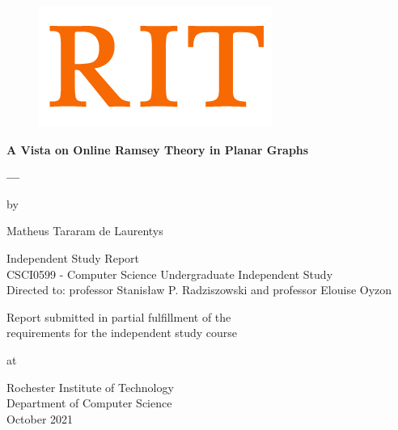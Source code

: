 \begin{titlepage}
\begin{figure}[H]
    \hspace*{-1.0cm}
    \vspace*{-0.5cm}
    \includegraphics[scale=1]{images/logo_rit.jpg}\\
\end{figure}

\begin{center}
    \vspace*{2cm}
    
    {\LARGE \textbf{A Vista on Online Ramsey Theory in Planar Graphs}}
    
    \vspace{0.5cm}
    \textbf{---}
    
	\vspace{1cm}
	 by
    \vspace{1cm}
    
   Matheus Tararam de Laurentys
\end{center}

\vspace{1cm}

\begin{center}   
	{\large Independent Study Report \\ 
		CSCI0599 - Computer Science Undergraduate Independent Study} \\
	\vspace{0.5cm}
	Directed to: professor Stanis\l{}aw P. Radziszowski and professor Elouise Oyzon\\
	
\end{center}

\vspace{1cm}

\begin{center}
	Report submitted in partial fulfillment of the\\
	requirements for the independent study course

	\vspace{1.0cm}
	at
	\vspace{1cm}
	
	Rochester Institute of Technology \\
	Department of Computer Science \\
	October 2021
\end{center}

\end{titlepage}